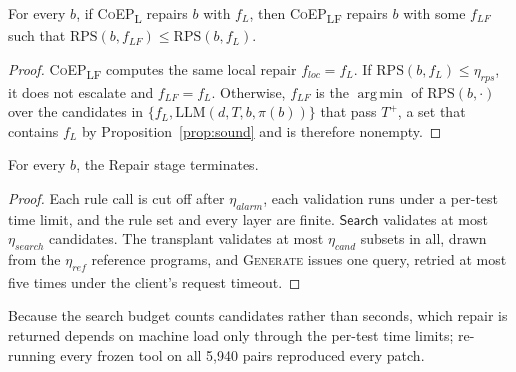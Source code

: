 \documentclass[acmsmall,screen,review,anonymous,nonacm]{acmart}
\DeclareMathOperator*{\argmin}{arg\,min}
\newcommand{\coepL}{\textsc{CoEP}\textsubscript{L}\xspace}
\newcommand{\coepLF}{\textsc{CoEP}\textsubscript{LF}\xspace}
\newcommand{\Fn}[1]{\textsc{#1}}
\newcommand{\aux}[1]{\ensuremath{\mathsf{#1}}}
\newcommand{\V}[1]{\ensuremath{\mathit{#1}}}
\newcommand{\RPS}{\mathrm{RPS}}
\begin{document}
\begin{proposition}\label{prop:gate}
For every $b$, if \coepL repairs $b$ with $f_L$, then \coepLF repairs $b$ with some $f_{LF}$ such that $\RPS(b, f_{LF}) \le \RPS(b, f_L)$.
\end{proposition}
\begin{proof}
\coepLF computes the same local repair $f_{\V{loc}} = f_L$. If $\RPS(b, f_L) \le \eta_{\V{rps}}$, it does not escalate and $f_{LF} = f_L$. Otherwise, $f_{LF}$ is the $\argmin$ of $\RPS(b, \cdot)$ over the candidates in $\{f_L, \mathrm{LLM}(d, T, b, \pi(b))\}$ that pass $T^{+}$, a set that contains $f_L$ by Proposition~\ref{prop:sound} and is therefore nonempty.
\end{proof}

\begin{proposition}[Termination]\label{prop:term}
For every $b$, the Repair stage terminates.
\end{proposition}
\begin{proof}
Each rule call is cut off after $\eta_{\V{alarm}}$, each validation runs under a per-test time limit, and the rule set and every layer are finite. \aux{Search} validates at most $\eta_{\V{search}}$ candidates. The transplant validates at most $\eta_{\V{cand}}$ subsets in all, drawn from the $\eta_{\V{ref}}$ reference programs, and \Fn{Generate} issues one query, retried at most five times under the client's request timeout.
\end{proof}
Because the search budget counts candidates rather than seconds, which repair is returned depends on machine load only through the per-test time limits; re-running every frozen tool on all 5{,}940 pairs reproduced every patch.
\end{document}
